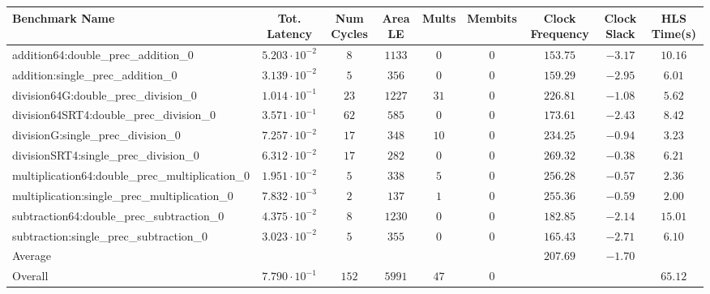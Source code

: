 \begin{tabular}{|l|c|c|c|c|c|c|c|c|}
\hline
Benchmark Name                                   & Tot. Latency            & Num Cycles & Area LE  & Mults  & Membits & Clock Frequency & Clock Slack & HLS Time(s) \\
\hline
addition64:double\_prec\_addition\_0             & $ 5.203 \cdot 10^{-2} $ & $ 8      $ & $ 1133 $ & $ 0  $ & $ 0   $ & $ 153.75      $ & $ -3.17   $ & $ 10.16   $ \\
addition:single\_prec\_addition\_0               & $ 3.139 \cdot 10^{-2} $ & $ 5      $ & $ 356  $ & $ 0  $ & $ 0   $ & $ 159.29      $ & $ -2.95   $ & $ 6.01    $ \\
division64G:double\_prec\_division\_0            & $ 1.014 \cdot 10^{-1} $ & $ 23     $ & $ 1227 $ & $ 31 $ & $ 0   $ & $ 226.81      $ & $ -1.08   $ & $ 5.62    $ \\
division64SRT4:double\_prec\_division\_0         & $ 3.571 \cdot 10^{-1} $ & $ 62     $ & $ 585  $ & $ 0  $ & $ 0   $ & $ 173.61      $ & $ -2.43   $ & $ 8.42    $ \\
divisionG:single\_prec\_division\_0              & $ 7.257 \cdot 10^{-2} $ & $ 17     $ & $ 348  $ & $ 10 $ & $ 0   $ & $ 234.25      $ & $ -0.94   $ & $ 3.23    $ \\
divisionSRT4:single\_prec\_division\_0           & $ 6.312 \cdot 10^{-2} $ & $ 17     $ & $ 282  $ & $ 0  $ & $ 0   $ & $ 269.32      $ & $ -0.38   $ & $ 6.21    $ \\
multiplication64:double\_prec\_multiplication\_0 & $ 1.951 \cdot 10^{-2} $ & $ 5      $ & $ 338  $ & $ 5  $ & $ 0   $ & $ 256.28      $ & $ -0.57   $ & $ 2.36    $ \\
multiplication:single\_prec\_multiplication\_0   & $ 7.832 \cdot 10^{-3} $ & $ 2      $ & $ 137  $ & $ 1  $ & $ 0   $ & $ 255.36      $ & $ -0.59   $ & $ 2.00    $ \\
subtraction64:double\_prec\_subtraction\_0       & $ 4.375 \cdot 10^{-2} $ & $ 8      $ & $ 1230 $ & $ 0  $ & $ 0   $ & $ 182.85      $ & $ -2.14   $ & $ 15.01   $ \\
subtraction:single\_prec\_subtraction\_0         & $ 3.023 \cdot 10^{-2} $ & $ 5      $ & $ 355  $ & $ 0  $ & $ 0   $ & $ 165.43      $ & $ -2.71   $ & $ 6.10    $ \\
\hline
Average                                          & $                     $ & $        $ & $      $ & $    $ & $     $ & $ 207.69      $ & $ -1.70   $ & $         $ \\
\hline
Overall                                          & $ 7.790 \cdot 10^{-1} $ & $ 152    $ & $ 5991 $ & $ 47 $ & $ 0   $ & $             $ & $         $ & $ 65.12   $ \\
\hline
\end{tabular}
